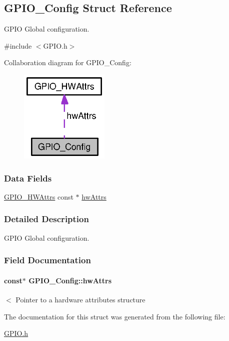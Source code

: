 \subsection{G\-P\-I\-O\-\_\-\-Config Struct Reference}
\label{struct_g_p_i_o___config}


G\-P\-I\-O Global configuration.  




{\ttfamily \#include $<$G\-P\-I\-O.\-h$>$}



Collaboration diagram for G\-P\-I\-O\-\_\-\-Config\-:
\nopagebreak
\begin{figure}[H]
\begin{center}
\leavevmode
\includegraphics[width=121pt]{struct_g_p_i_o___config__coll__graph}
\end{center}
\end{figure}
\subsubsection*{Data Fields}
\begin{DoxyCompactItemize}
\item 
\hyperlink{struct_g_p_i_o___h_w_attrs}{G\-P\-I\-O\-\_\-\-H\-W\-Attrs} const $\ast$ \hyperlink{struct_g_p_i_o___config_a0d82bf1e726a60e4c015d565c0485809}{hw\-Attrs}
\end{DoxyCompactItemize}


\subsubsection{Detailed Description}
G\-P\-I\-O Global configuration. 

\subsubsection{Field Documentation}
\paragraph[{hw\-Attrs}]{ const$\ast$ G\-P\-I\-O\-\_\-\-Config\-::hw\-Attrs}\label{struct_g_p_i_o___config_a0d82bf1e726a60e4c015d565c0485809}
$<$ Pointer to a hardware attributes structure 

The documentation for this struct was generated from the following file\-:\begin{DoxyCompactItemize}
\item 
\hyperlink{_g_p_i_o_8h}{G\-P\-I\-O.\-h}\end{DoxyCompactItemize}
